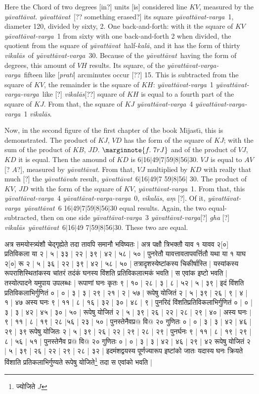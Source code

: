 \documentclass[12pt]{book}
\let\*=\d
\def\kala{\textit{ka\-l\=a}}
\def\ya{\textit{y\=avat\-t\=avat}}
\def\yava{\textit{y\=avat\-t\=avat-varga}}
\def\yavava{\textit{y\=avat\-t\=avat-varga-varga}}
\def\vikalas{\textit{vi\-ka\-l\=as}}
\def\danda{$|$}
\begin{document}
\newpage

Here the Chord of two degrees [in?] units [is] considered line $KV$, measured by the \ya. 
\ya\ [?? something erased?] its square \yava\ 1, diameter 120, divided by sixty, 2. 
One back-and-forth: with it the square of $KV$ \yava\ 1 from sixty with one back-and-forth 2
when divided, the quotient from the square of \ya\ half-\kala, and it has the form of thirty \vikalas\
of \yava\ 30. Because of the \ya\ having the form of degrees, this amount of 
$VH$ results. Its square,  of the \yavava\ fifteen like [\textit{prati}] arcminutes occur [??] 15. 
This is subtracted from the square of $KV$, the remainder is the square of $KH$: 
\yava\ 1 \yavava\ like [?] \vikalas [??] square of $KH$ is equal to a fourth part of the
square of $KJ$. From that, the square of $KJ$ \yava\ 4 \yavava\ 1 \vikalas.

Now, in the second figure of the first chapter of the book Mijast\={\i}, this is demonstrated.
The product of $KJ$, $VD$ has the form of the square of $KJ$; with
the sum of the product of $KB$, $JD$. 
$\marginnote{f.~7r J}$
and of the product of $VJ$, $KD$ it is equal.  Then the amound of $KD$ is 
6\danda 16\danda 49\danda 7\danda 59\danda 8\danda 56\danda 30.  $VJ$ is equal to 
$AV$ [? $A$?], measured by \ya.  From that, $VJ$ multiplied by $KD$ with really
that much [?] the \ya s result, \ya\ 6\danda 16\danda 49\danda 7 59\danda 8\danda 56\danda
30. 
The product of $KV$, $JD$ with the form of
the square of $KV$, \yava\ 1. From that, this \yava\ 4 \yavava\ 0, \vikalas, 
\textit{a\*m} [?]. Of it, \yava\ \ya\ 6 16\danda 49\danda 7\danda 59\danda 8\danda 56\danda 30
equal results. Again, the two equal-subtracted, then on one side \yava\ 3 \yava  [?] \textit{gha} [?]
\vikalas\ \ya\ 6\danda 16\danda 49 7\danda 59\danda 8\danda 56\danda 30. These two are equal.

\newpage


{\s अत्र समयोस्त्र्यंशौ चेद्गृह्येते तदा तावपि
समानौ भविष्यतः | अत्र पक्षौ त्रिभक्तौ याव १ यावव २[०] प्रतिविकला 
या २ | ५ | ३३ | २२ | ३९ | ४२ | ५८ | ५० |
पुनरेतौ यावत्तावतापवर्त्तितौ यथा या १
याघ २[०] रू २ | ५ | ३६ | २२ | ३९ | ४२ | ५८ | ५० |
तत्रादृशस्येष्टांकस्य चिकीर्षास्ति | यस्यांकस्य रूपराशिस्थितांकस्य चांतरं तदंकं घनस्य विंशति
प्रतिविकलात्मकं भवति | स एवांक इष्टो भवति | तस्योत्पादने यमुपाय उपलब्धः | रूपाणां घनः कृतः ९ | १० | २८ | ३ | ८ | ५२ | ५ | ३९ |
इदं विंशति प्रतिविकलाभिर्गुणितं ० | ० | ३ | ३ | २९ | २१ | २ | ५७ | रूपेषु योजितं २ | ५ | ३९ | २६ | ९ | ४ | १ | ४७ अस्य घनः ९ | ११ | ८ | १६ | ३२ | ३० | ४८ | ९ | पुनरिदं विंशतिप्रतिविकलाभिर्गुणितं ० | ० | ३ | ३ | ४२ | ४५ | ३० | ५० |
रूपेषु योजितं २ | ५ | ३९ | २६ | २२ | २८ | २९ | ४० | अस्य घनः $|$\marginnote{f.~7v J}  
९ | ११ | ८ | १९ | २८ |५६ | २३ | ५० | पुनस्तेनैवप्र@ वि@
२० गुणितः ० | ० | ३ | ३ | ४२ | ४६ | २९ | ३९
रूपेषु योजितः २ | ५ | ३९ | २६ | २२ | २९ | २८ | २९ | पुनर्घनः ९ | ११ | ८ | १९ | २९ | ८ | ५६ | ५१ | पुनस्तेनैव प्र@ वि@ २० गुणितः ० | ० | ३ | ३ | ४२ | ४६ | २९ | ४२
रूपेषु योजितं २ | ५ | ३९ | २६ | २२ | २९ | २८ | ३२ |
इदमंशद्वयस्य पूर्णज्यारूप इष्टांको जातः यदास्य घनः क्रियते विंशाति प्रतिकलाभिर्गुण्यते
रूपेषु योजिते\footnote{{\s ज्योजिते} $J$} तदा स एवांको भवति |} 
\end{document}
